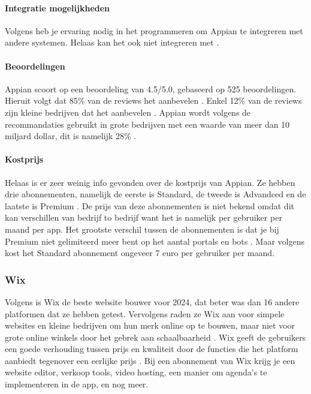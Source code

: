 \paragraph{Integratie mogelijkheden}
Volgens \textcite{Marvin2017} heb je ervaring nodig in het programmeren om Appian te integreren met andere systemen. 
Helaas kan het ook niet integreren met \textcite{MAKE.com2024a}.

\paragraph{Beoordelingen}
Appian scoort op \textcite{Gartner2024} een beoordeling van 4.5/5.0, gebaseerd op 525 beoordelingen. Hieruit volgt dat 85\% van de reviews het aanbevelen \autocite{Gartner2024}.
Enkel 12\% van de reviews zijn kleine bedrijven dat het aanbevelen \autocite{Gartner2024}. Appian wordt volgens de recommandaties gebruikt in grote bedrijven met een waarde van meer dan 10 miljard dollar, dit is namelijk 28\% \autocite{Gartner2024}.
\paragraph{Kostprijs}
Helaas is er zeer weinig info gevonden over de kostprijs van Appian. Ze hebben drie abonnementen, namelijk de eerste is 
Standard, de tweede is Advandced en de laatste is Premium \autocite{Appian2024}. De prijs van deze abonnementen is niet bekend omdat dit kan verschillen van bedrijf to bedrijf want het is namelijk 
per gebruiker per maand per app. Het grootste verschil tussen de abonnementen is dat je bij Premium niet gelimiteerd meer bent op het aantal portals en bots \autocite{Appian2024}. Maar volgens
\textcite{Shala} kost het Standard abonnement ongeveer 7 euro per gebruiker per maand.


\subsubsection*{Wix}
Volgens \textcite{Ryan2024} is Wix de beste website bouwer voor 2024, dat beter was dan 16 andere platformen dat ze hebben getest. Vervolgens raden ze 
Wix aan voor simpele websites en kleine bedrijven om hun merk online op te bouwen, maar niet voor grote online winkels door het gebrek aan schaalbaarheid \autocite{Ryan2024}.
Wix geeft de gebruikers een goede verhouding tussen prijs en kwaliteit door de functies die het platform aanbiedt tegenover een eerlijke prijs  \autocite{Singleton2024}.
Bij een abonnement van Wix krijg je een website editor, verkoop tools, video hosting, een manier om agenda's te implementeren in de app, en nog meer.
